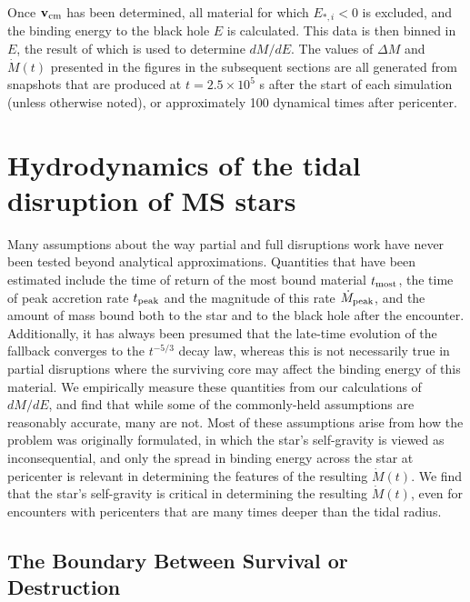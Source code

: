 \documentclass[twocolumn]{emulateapj}
\newcommand{\dmde}{dM/dE}
\newcommand{\md}{\dot{M}\left(t\right)}
\newcommand{\mdpeak}{\dot{M}_{\rm peak}}
\newcommand{\tpeak}{t_{\rm peak}}
\begin{document}
Once ${\bf v}_{\rm cm}$ has been determined, all material for which $E_{\ast,i} < 0$ is excluded, and the binding energy to the black hole $E$ is calculated. This data is then binned in $E$, the result of which is used to determine $\dmde$. The values of $\Delta M$ and $\md$ presented in the figures in the subsequent sections are all generated from snapshots that are produced at $t = 2.5 \times 10^{5}$ s after the start of each simulation (unless otherwise noted), or approximately 100 dynamical times after pericenter.

\section{Hydrodynamics of the tidal disruption of MS stars}\label{sec:results}

Many assumptions about the way partial and full disruptions work have never been tested beyond analytical approximations. Quantities that have been estimated include the time of return of the most bound material $t_{\rm most}$, the time of peak accretion rate $\tpeak$ and the magnitude of this rate $\mdpeak$, and the amount of mass bound both to the star and to the black hole after the encounter. Additionally, it has always been presumed that the late-time evolution of the fallback converges to the $t^{-5/3}$ decay law, whereas this is not necessarily true in partial disruptions where the surviving core may affect the binding energy of this material. We empirically measure these quantities from our calculations of $\dmde$, and find that while some of the commonly-held assumptions are reasonably accurate, many are not. Most of these assumptions arise from how the problem was originally formulated, in which the star's self-gravity is viewed as inconsequential, and only the spread in binding energy across the star at pericenter is relevant in determining the features of the resulting $\md$. We find that the star's self-gravity is critical in determining the resulting $\md$, even for encounters with pericenters that are many times deeper than the tidal radius.

\subsection{The Boundary Between Survival or Destruction}\label{subsec:survival}
\end{document}
